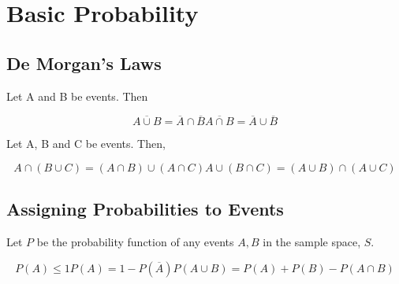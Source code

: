 \section{Basic Probability}

\subsection{De Morgan's Laws} %
\label{sec:de_morgan_s_laws}

Let A and B be events. Then

\begin{subequations}
\begin{equation}
  \overline{A \cup B}= \overline{A} \cap \overline{B}
\end{equation}
\begin{equation}
  \overline{A \cap B}= \overline{A} \cup \overline{B}
\end{equation}
\end{subequations}

Let A, B and C be events. Then,

\begin{subequations}
\begin{equation}
  A \cap (B \cup C) = (A \cap B)\cup(A\cap C)
\end{equation}
\begin{equation}
  A \cup (B \cap C) = (A \cup B)\cap(A\cup C)
\end{equation}
\end{subequations}


\subsection{Assigning Probabilities to Events} %
\label{sec:assigning_probabilities_to_events}

Let $P$ be the probability function of any events $A, B$ in the sample space, $S$.

\begin{subequations}
\begin{equation}
  P(A) \leq 1
\end{equation}
\begin{equation}
  P(A) = 1 - P(\overline{A})
\end{equation}
\begin{equation}
  P(A\cup B) = P(A) + P(B) - P(A\cap B)
\end{equation}
\end{subequations}

